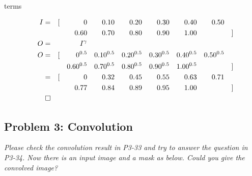 \documentclass[
        ]{beamer}
\begin{document}
        \begin{frame}[c]{\subsecname terms}
            \begin{overprint}
            \end{overprint}   
        \end{frame}    
        
        \begin{frame}[c]{\subsecname}
            \begin{overprint}
            	\centering
                \begin{align*}
             I=& & [ & & 0    & & 0.10 & & 0.20 & & 0.30 & & 0.40 & & 0.50 & & \\
               & &   & & 0.60 & & 0.70 & & 0.80 & & 0.90 & & 1.00 & &      & & ]\\
             O=& &   & & I^\gamma\\
             O=& & [ & & 0^{0.5}       & & 0.10^{0.5}    & & 0.20^{0.5}    
                     & & 0.30^{0.5}    & & 0.40^{0.5}    & & 0.50^{0.5}    & & \\
               & &   & & 0.60^{0.5}    & & 0.70^{0.5}    & & 0.80^{0.5} 
                     & & 0.90^{0.5}    & & 1.00^{0.5}    & &               & & ]\\                
              =& & [ & & 0    & & 0.32 & & 0.45 & & 0.55 & & 0.63 & & 0.71 & & \\
               & &   & & 0.77 & & 0.84 & & 0.89 & & 0.95 & & 1.00 & &      & & ]\\
               \qed
                \end{align*}
            \end{overprint}   
        \end{frame}  
        
    \subsection{Problem 3: Convolution}
        \begin{frame}[c]{\subsecname}
            \emph{Please check the convolution result in P3-33 and try to answer the question in P3-34. Now there is an input image and a mask as below. Could you give the convolved image?}
        \end{frame}
        
\end{document}
